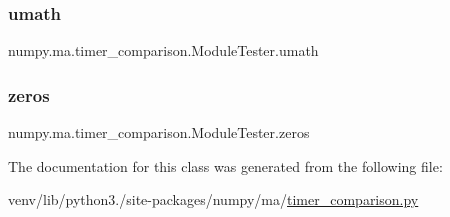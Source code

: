 \subsubsection{\texorpdfstring{umath}{umath}}
{\footnotesize\ttfamily numpy.\+ma.\+timer\+\_\+comparison.\+Module\+Tester.\+umath}

\mbox{\label{classnumpy_1_1ma_1_1timer__comparison_1_1ModuleTester_ab3887e687dde074abd65df37bf1c5429}} 
\subsubsection{\texorpdfstring{zeros}{zeros}}
{\footnotesize\ttfamily numpy.\+ma.\+timer\+\_\+comparison.\+Module\+Tester.\+zeros}



The documentation for this class was generated from the following file\+:\begin{DoxyCompactItemize}
\item 
venv/lib/python3./site-\/packages/numpy/ma/\hyperlink{timer__comparison_8py}{timer\+\_\+comparison.\+py}\end{DoxyCompactItemize}
